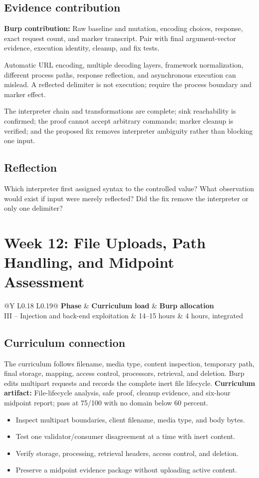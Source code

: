 \documentclass[11pt]{article}
\makeatletter
\newcommand{\weekheader}[5]{%
  \clearpage
  \section{Week #1: #2}
  \begin{tcolorbox}[colback=Navy,colframe=Navy,coltext=white]
    \begin{tabularx}{\linewidth}{@{}Y L{0.18\linewidth} L{0.19\linewidth}@{}}
      \textbf{Phase} & \textbf{Curriculum load} & \textbf{Burp allocation}\\
      #3 & #4 hours & #5 hours, integrated
    \end{tabularx}
  \end{tcolorbox}
}
\newcommand{\weekfield}[2]{%
  \Needspace{5\baselineskip}
  \subsection*{#1}
  #2
}
\newcommand{\curriculumartifact}[1]{\textbf{Curriculum artifact:} #1}
\newcommand{\burpevidence}[1]{\textbf{Burp contribution:} #1}
\makeatother
\begin{document}
\weekfield{Evidence contribution}{\burpevidence{Raw baseline and mutation,
encoding choices, response, exact request count, and marker transcript.} Pair
with final argument-vector evidence, execution identity, cleanup, and fix tests.}

\begin{troubleshootingbox}
Automatic URL encoding, multiple decoding layers, framework normalization,
different process paths, response reflection, and asynchronous execution can
mislead. A reflected delimiter is not execution; require the process boundary
and marker effect.
\end{troubleshootingbox}

\begin{checkpoints}
The interpreter chain and transformations are complete; sink reachability is
confirmed; the proof cannot accept arbitrary commands; marker cleanup is verified;
and the proposed fix removes interpreter ambiguity rather than blocking one input.
\end{checkpoints}

\weekfield{Reflection}{Which interpreter first assigned syntax to the controlled
value? What observation would exist if input were merely reflected? Did the fix
remove the interpreter or only one delimiter?}

\weekheader{12}{File Uploads, Path Handling, and Midpoint Assessment}{III -- Injection and back-end exploitation}{14--15}{4}

\weekfield{Curriculum connection}{The curriculum follows filename, media type,
content inspection, temporary path, final storage, mapping, access control,
processors, retrieval, and deletion. Burp edits multipart requests and records
the complete inert file lifecycle. \curriculumartifact{File-lifecycle analysis,
safe proof, cleanup evidence, and six-hour midpoint report; pass at 75/100 with
no domain below 60 percent.}}

\begin{objectivebox}
\begin{itemize}
  \item Inspect multipart boundaries, client filename, media type, and body bytes.
  \item Test one validator/consumer disagreement at a time with inert content.
  \item Verify storage, processing, retrieval headers, access control, and deletion.
  \item Preserve a midpoint evidence package without uploading active content.
\end{itemize}
\end{objectivebox}
\end{document}
